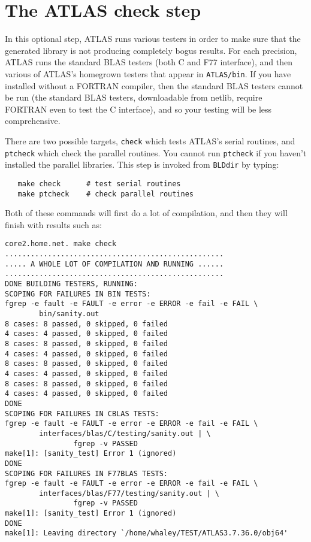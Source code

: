 \documentclass[11pt]{article}
\begin{document}
\section{The ATLAS check step}
\label{sec-check}
In this optional step, ATLAS runs various testers in order to make sure
that the generated library is not producing completely bogus results.
For each precision, ATLAS runs the standard BLAS testers (both C and F77
interface), and then various of ATLAS's homegrown testers that appear
in {\tt ATLAS/bin}.  If you have installed without a FORTRAN compiler,
then the standard BLAS testers cannot be run (the standard BLAS testers,
downloadable from netlib, require FORTRAN even to test the C interface),
and so your testing will be less comprehensive.

There are two possible targets, {\tt check} which tests ATLAS's serial
routines, and {\tt ptcheck} which check the parallel routines.  You cannot
run {\tt ptcheck} if you haven't installed the parallel libraries.
This step is invoked from {\tt BLDdir} by typing:
\begin{verbatim}
   make check      # test serial routines
   make ptcheck    # check parallel routines
\end{verbatim}

Both of these commands will first do a lot of compilation, and then they
will finish with results such as:
\vspace*{-0.1in}
\begin{verbatim}
core2.home.net. make check
...................................................
..... A WHOLE LOT OF COMPILATION AND RUNNING ......
...................................................
DONE BUILDING TESTERS, RUNNING:
SCOPING FOR FAILURES IN BIN TESTS:
fgrep -e fault -e FAULT -e error -e ERROR -e fail -e FAIL \
        bin/sanity.out
8 cases: 8 passed, 0 skipped, 0 failed
4 cases: 4 passed, 0 skipped, 0 failed
8 cases: 8 passed, 0 skipped, 0 failed
4 cases: 4 passed, 0 skipped, 0 failed
8 cases: 8 passed, 0 skipped, 0 failed
4 cases: 4 passed, 0 skipped, 0 failed
8 cases: 8 passed, 0 skipped, 0 failed
4 cases: 4 passed, 0 skipped, 0 failed
DONE
SCOPING FOR FAILURES IN CBLAS TESTS:
fgrep -e fault -e FAULT -e error -e ERROR -e fail -e FAIL \
        interfaces/blas/C/testing/sanity.out | \
                fgrep -v PASSED
make[1]: [sanity_test] Error 1 (ignored)
DONE
SCOPING FOR FAILURES IN F77BLAS TESTS:
fgrep -e fault -e FAULT -e error -e ERROR -e fail -e FAIL \
        interfaces/blas/F77/testing/sanity.out | \
                fgrep -v PASSED
make[1]: [sanity_test] Error 1 (ignored)
DONE
make[1]: Leaving directory `/home/whaley/TEST/ATLAS3.7.36.0/obj64'
\end{verbatim}
\end{document}
